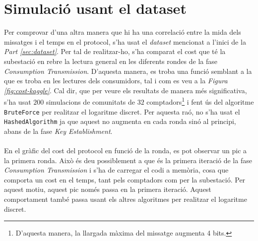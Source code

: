 \section{Simulació usant el dataset}
Per comprovar d'una altra manera que hi ha una correlació entre la mida dels missatges i el temps en el protocol, s'ha usat el \textit{dataset} mencionat a l'inici de la \textit{Part \ref{sec:dataset}}. Per tal de realitzar-ho, s'ha comparat el cost que té la subestació en rebre la lectura general en les diferents rondes de la fase \textit{Consumption Transmission}. D'aquesta manera, es troba una funció semblant a la que es troba en les lectures dels consumidors, tal i com es veu a la \textit{Figura \ref{fig:cost-kaggle}}. Cal dir, que per veure els resultats de manera més significativa, s'ha usat $200$ simulacions de comunitats de $32$ comptadors\footnote{D'aquesta manera, la llargada màxima del missatge augmenta 4 bits.} i fent ús del algoritme \texttt{BruteForce} per realitzar el logaritme discret. Per aquesta raó, no s'ha usat el \texttt{HashedAlgorithm} ja que aquest no augmenta en cada ronda sinó al principi, abans de la fase \textit{Key Establishment}.
\\
\\
En el gràfic del cost del protocol en funció de la ronda, es pot observar un pic a la primera ronda. Això és deu possiblement a que és la primera iteració de la fase \textit{Consumption Transmission} i s'ha de carregar el codi a memòria, cosa que comporta un cost en el temps, tant pels comptadors com per la subestació. Per aquest motiu, aquest pic només passa en la primera iteració. Aquest comportament també passa usant els altres algoritmes per realitzar el logaritme discret.

